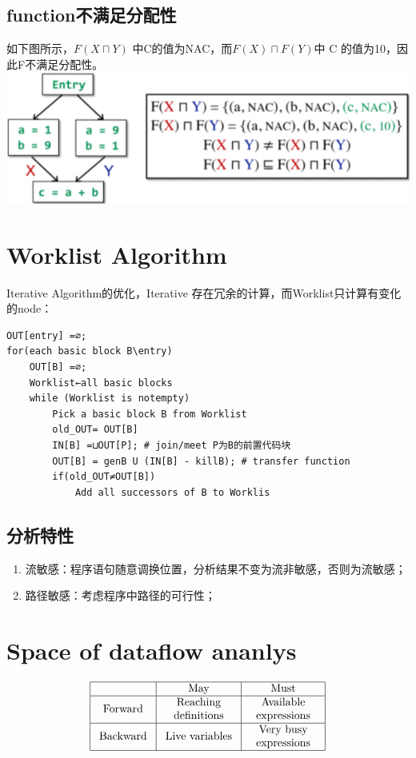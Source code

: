\documentclass[a4paper]{article}
\theoremstyle{definition}
\begin{document}
\subsection{function不满足分配性}
如下图所示，$F(X \sqcap Y)$ 中C的值为NAC，而$F(X) \sqcap F(Y)$中 C 的值为10，因此F不满足分配性。
\includegraphics{img/distrib.png}
\section{Worklist Algorithm}
Iterative Algorithm的优化，Iterative 存在冗余的计算，而Worklist只计算有变化的node：
\begin{lstlisting}
OUT[entry] =∅;
for(each basic block B\entry) 
	OUT[B] =∅;
    Worklist←all basic blocks
	while (Worklist is notempty) 
    	Pick a basic block B from Worklist
		old_OUT= OUT[B]
        IN[B] =⊔OUT[P]; # join/meet P为B的前置代码块
        OUT[B] = genB U (IN[B] - killB); # transfer function 
        if(old_OUT≠OUT[B])
        	Add all successors of B to Worklis
\end{lstlisting}

\subsection{分析特性}
\begin{enumerate}
  \item 流敏感：程序语句随意调换位置，分析结果不变为流非敏感，否则为流敏感；
  \item 路径敏感：考虑程序中路径的可行性；
\end{enumerate}
\section{Space of dataflow ananlys \cite{cs153lec18}}
$$\begin{array}{|c|c|c|}
  \hline & \text { May } & \text { Must } \\
  \hline \text { Forward } & \begin{array}{c}
  \text { Reaching } \\
  \text { definitions }
  \end{array} & \begin{array}{c}
  \text { Available } \\
  \text { expressions }
  \end{array} \\
  \hline \text { Backward } & \text { Live variables } & \begin{array}{c}
  \text { Very busy } \\
  \text { expressions }
  \end{array} \\
  \hline
  \end{array}$$
\end{document}
